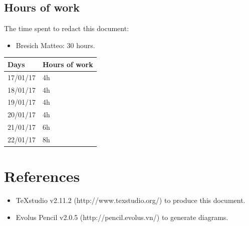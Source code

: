 \documentclass{article}
\begin{document}
		\subsection{Hours of work} The time spent to redact this document:
		\begin{itemize}
			\item Bresich Matteo: 30 hours.
		\end{itemize}
		
		\begin{center}
			\begin{tabular}{ | l | l |}
				\hline
				Days & Hours of work\\ \hline
				17/01/17 & 4h\\\hline
				18/01/17 & 4h\\\hline
				19/01/17 & 4h\\\hline
				20/01/17 & 4h\\\hline
				21/01/17 & 6h\\\hline
				22/01/17 & 8h\\\hline
			\end{tabular}
		\end{center}
	\section{References}
		\begin{itemize}
			\item TeXstudio v2.11.2 (http://www.texstudio.org/) to produce this document.
			\item Evolus Pencil v2.0.5 (http://pencil.evolus.vn/) to generate diagrams.
		\end{itemize}
\end{document}
